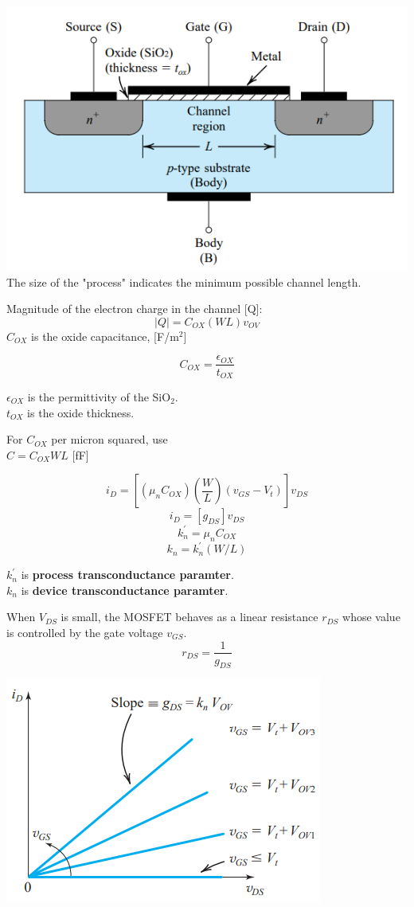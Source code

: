 \documentclass[a4paper]{article}
\begin{document}
\begin{multicols}{3}
\raggedright
\fontsize{6pt}{0.3pt}\selectfont
\setlength{\abovedisplayskip}{2pt}
\setlength{\belowdisplayskip}{0pt}

\includegraphics[width=\linewidth]{imgs/nmos}
The size of the "process" indicates the minimum
possible channel length. 

Magnitude of the electron charge in the channel [Q]:$$|Q|=C_{OX}(WL)v_{OV}$$
$C_{OX}$ is the oxide capacitance, [F/m$^2$]

$$C_{OX}=\frac{\epsilon_{OX}}{t_{OX}}$$

$\epsilon_{OX}$ is the permittivity of the SiO$_2$.\\
$t_{OX}$ is the oxide thickness.

For $C_{OX}$ per micron squared, use \\
$C=C_{OX}WL$ [fF]

$$i_D=\left[ (\mu_nC_{OX})\left(\frac{W}{L}\right)(v_{GS}-V_t)\right]v_{DS}$$
$$i_D=\left[ g_{DS} \right]v_{DS}$$
$$k_n^{'}=\mu_nC_{OX}$$
$$k_n=k_n^{'}(W/L)$$

$k_n^{'}$ is \textbf{process transconductance paramter}.\\
$k_n$ is \textbf{device transconductance paramter}.
\vspace{1mm}

When $V_{DS}$ is small, the MOSFET behaves as a linear 
resistance $r_{DS}$ whose value is controlled by the gate 
voltage $v_{GS}$.
$$r_{DS}=\frac{1}{g_{DS}}$$

\includegraphics[width=\linewidth]{imgs/nmos_as_r}


\end{multicols}
\end{document}
